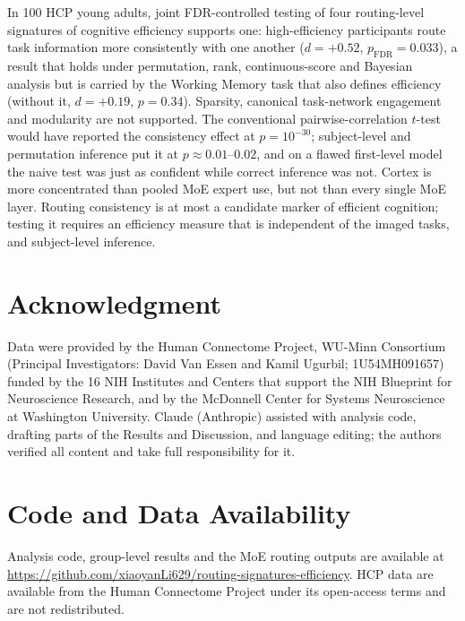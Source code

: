 \documentclass[conference]{IEEEtran}
\begin{document}
In 100 HCP young adults, joint FDR-controlled testing of four routing-level signatures of cognitive efficiency supports one: high-efficiency participants route task information more consistently with one another ($d = +0.52$, $p_{\text{FDR}} = 0.033$), a result that holds under permutation, rank, continuous-score and Bayesian analysis but is carried by the Working Memory task that also defines efficiency (without it, $d = +0.19$, $p = 0.34$). Sparsity, canonical task-network engagement and modularity are not supported. The conventional pairwise-correlation $t$-test would have reported the consistency effect at $p = 10^{-30}$; subject-level and permutation inference put it at $p \approx 0.01$--$0.02$, and on a flawed first-level model the naive test was just as confident while correct inference was not. Cortex is more concentrated than pooled MoE expert use, but not than every single MoE layer. Routing consistency is at most a candidate marker of efficient cognition; testing it requires an efficiency measure that is independent of the imaged tasks, and subject-level inference.

\section*{Acknowledgment}
Data were provided by the Human Connectome Project, WU-Minn Consortium (Principal Investigators: David Van Essen and Kamil Ugurbil; 1U54MH091657) funded by the 16 NIH Institutes and Centers that support the NIH Blueprint for Neuroscience Research, and by the McDonnell Center for Systems Neuroscience at Washington University. Claude (Anthropic) assisted with analysis code, drafting parts of the Results and Discussion, and language editing; the authors verified all content and take full responsibility for it.

\section*{Code and Data Availability}
Analysis code, group-level results and the MoE routing outputs are available at \url{https://github.com/xiaoyanLi629/routing-signatures-efficiency}. HCP data are available from the Human Connectome Project under its open-access terms and are not redistributed.



\end{document}
